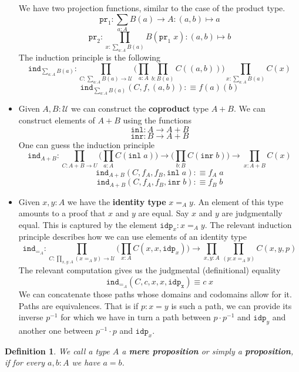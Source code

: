 \documentclass[12pt]{report}
\newtheorem{defn}[thm]{Definition}
\begin{document}
\begin{itemize}
	We have two projection functions, similar to the case of the product type.
	$$\mathtt{pr}_1 : \sum_{a:A}B(a) \rightarrow A : (a,b) \mapsto a$$
	$$\mathtt{pr}_2 : \prod_{x : \sum_{a:A}B(a)}B(\mathtt{pr}_1\; x) : (a,b) \mapsto b$$
	The induction principle is the following
	$$\mathtt{ind}_{\sum_{a:A}B(a)} : \prod_{C : \sum_{a:A}B(a) \rightarrow \mathcal{U}}\Big( \prod_{a : A}\prod_{b : B(a)}C((a,b)) \Big)\prod_{x : \sum_{a:A}B(a)}C(x)$$
	$$\mathtt{ind}_{\sum_{a:A}B(a)}(C, f,(a,b) ) :\equiv f(a)(b)$$
	\item Given $A, B : \mathcal{U}$ we can construct the \textbf{coproduct} type $A + B$. 
	We can construct elements of $A + B$ using the functions
	$$\mathtt{inl} : A \rightarrow A+B$$
	$$\mathtt{inr} : B \rightarrow A+B$$
	One can guess the induction principle
	$$\mathtt{ind}_{A+B} : \prod_{C : A+B \rightarrow U} \Big(\prod_{a : A}C(\mathtt{inl}\;a)\Big) \rightarrow \Big(\prod_{b : B}C(\mathtt{inr}\;b)\Big) \rightarrow \prod_{x : A+ B}C(x)$$
	$$\mathtt{ind}_{A+B}(C, f_A, f_B, \mathtt{inl}\; a) :\equiv f_A\; a$$
	$$\mathtt{ind}_{A+B}(C, f_A, f_B, \mathtt{inr}\; b) :\equiv f_B\; b$$
	\item Given $x, y : A$ we have the \textbf{identity type} $x =_A y$. 
	An element of this type amounts to a proof that $x$ and $y$ are equal. 
	Say $x$ and $y$ are judgmentally equal. 
	This is captured by the element $\mathtt{idp}_x : x =_A y$. 
	The relevant induction principle describes how we can use elements of an identity type
	$$\mathtt{ind}_{=_{A}} : \prod_{C : \prod_{x,y : A} (x =_A y) \rightarrow \mathcal{U}} \Big( \prod_{x : A}C(x,x,\mathtt{idp}_x) \Big) \rightarrow \prod_{x,y : A} \prod_{(p : x =_A y)} C(x,y,p)$$
	The relevant computation gives us the judgmental (definitional) equality 
	$$\mathtt{ind}_{=_A} (C,c,x,x,\mathtt{idp_x}) \equiv c\; x$$
	We can concatenate those paths whose domains and codomains allow for it. 
	Paths are equivalences. That is if $p : x = y$ is such a  path, we can provide its inverse $p^{-1}$ for which we have in turn a path between $p\cdot p^{-1}$ and $\mathtt{idp}_y$ and another one between $p^{-1}\cdot p$ and $\mathtt{idp}_x$. 
\end{itemize}
	\begin{defn}
	We call a type $A$ a \textbf{mere proposition} or simply a \textbf{proposition}, if for every $a,b : A$ we have $a = b$.
	\end{defn}
\end{document}
